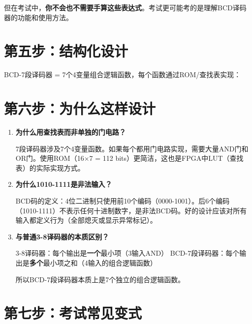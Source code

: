 但在考试中，\textbf{你不会也不需要手算这些表达式}。考试更可能考的是理解BCD译码器的功能和使用方法。

\section{第五步：结构化设计}

BCD-7段译码器 = 7个4变量组合逻辑函数，每个函数通过ROM/查找表实现：

\begin{center}
\end{center}

\section{第六步：为什么这样设计}

\begin{enumerate}
  \item \textbf{为什么用查找表而非单独的门电路？}

  7段译码器涉及7个4变量函数。如果每个都用门电路实现，需要大量AND门和OR门。使用ROM（16×7 = 112 bits）更简洁，这也是FPGA中LUT（查找表）的实际实现方式。

  \item \textbf{为什么1010-1111是非法输入？}

  BCD码的定义：4位二进制只使用前10个编码（0000-1001）。后6个编码（1010-1111）不表示任何十进制数字，是非法BCD码。好的设计应该对所有输入都定义行为（全部熄灭或显示异常标记）。

  \item \textbf{与普通3-8译码器的本质区别？}

  3-8译码器：每个输出是\textbf{一个}最小项（3输入AND）
  BCD-7段译码器：每个输出是\textbf{多个}最小项之和（4输入的组合逻辑函数）

  所以BCD-7段译码器本质上是7个独立的组合逻辑函数。
\end{enumerate}

\section{第七步：考试常见变式}

